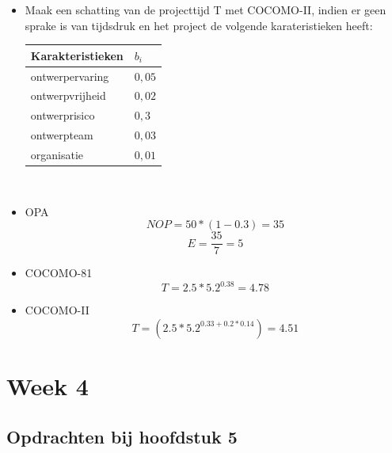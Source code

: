\documentclass[a4paper,titlepage]{artikel1}
\begin{document}
{\begin{itemize}
     \item Maak een schatting van de projecttijd T met COCOMO-II, indien er geen sprake is van tijdsdruk en het project de volgende karateristieken heeft:\\
       \begin{center}
       \begin{tabular}[]{|l|l|}
         \hline
         Karakteristieken & $b_i$ \\
         \hline
         ontwerpervaring & $0,05$ \\
         ontwerpvrijheid & $0,02$ \\
         ontwerprisico & $0,3$ \\
         ontwerpteam & $0,03$ \\
         organisatie & $0,01$ \\
         \hline
       \end{tabular}
       \\
       \end{center}
   \end{itemize}
   }
   \begin{itemize}
    \item OPA
	  \begin{displaymath}
	   NOP=50*(1-0.3)=35
	  \end{displaymath} 
	  \begin{displaymath}
	   E=\frac{35}{7}=5
	  \end{displaymath}
    \item COCOMO-81
	  \begin{displaymath}
	   T=2.5*5.2^{0.38}=4.78
	  \end{displaymath}
    \item COCOMO-II
	  \begin{displaymath}
	   T=(2.5*5.2^{0.33+0.2*0.14})=4.51
	  \end{displaymath}
   \end{itemize}
   \section{Week 4}

   \subsection{Opdrachten bij hoofdstuk 5}
\end{document}
